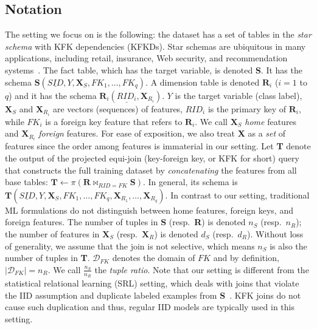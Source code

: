 \documentclass{vldb}
\begin{document}
\subsection{Notation}
The setting we focus on is the following: the dataset has a set of tables in the \textit{star schema} with KFK dependencies (KFKDs).
Star schemas are ubiquitous in many applications, including retail, insurance, Web security, and recommendation systems~\cite{cowbook,hamlet,orion}.
The fact table, which has the target variable, is denoted \textbf{S}. It has the schema $\textbf{S}(\underline{SID},Y, \textbf{X}_S, FK_1, \dots, FK_q)$.
A dimension table is denoted $\textbf{R}_i$ ($i = 1$ to $q$) and it has the schema $\textbf{R}_i(\underline{RID_i},\textbf{X}_{R_i})$.
$Y$ is the target variable (class label), $\textbf{X}_S$ and $\textbf{X}_{R_i}$ are vectors (sequences) of features, $RID_i$ is the primary key
of $\textbf{R}_i$, while $FK_i$ is a foreign key feature that refers to $\textbf{R}_i$. 
We call $\textbf{X}_S$ \textit{home} features and $\textbf{X}_{R_i}$ \textit{foreign} features.
For ease of exposition, we also treat \textbf{X} as a \textit{set} of features since the order among features is immaterial in our setting.
Let \textbf{T} denote the output of the projected equi-join (key-foreign key, or KFK for short) query that constructs the full training dataset by 
\textit{concatenating} the features from all base tables: $\textbf{T} \leftarrow \pi(\textbf{R} \bowtie_{RID=FK} \textbf{S})$. In general, its schema is 
$\textbf{T}(\underline{SID},Y,\textbf{X}_S,FK_1,\dots,FK_q,\textbf{X}_{R_1},\dots,\textbf{X}_{R_q})$. In contrast to our setting, traditional ML 
formulations do not distinguish between home features, foreign keys, and foreign features. The number of tuples in \textbf{S} (resp.~\textbf{R}) is 
denoted $n_S$ (resp.~$n_R$); the number of features in $\textbf{X}_S$ (resp.~$\textbf{X}_R$) is denoted $d_S$ (resp.~$d_R$). Without loss of generality, we
assume that the join is not selective, which means $n_S$ is also the number of tuples in \textbf{T}. $\mathcal{D}_{FK}$ denotes the domain of $FK$ 
and by definition, $|\mathcal{D}_{FK}| = n_R$. We call $\frac{n_S}{n_R}$ the \textit{tuple ratio}.
Note that our setting is different from the statistical relational learning (SRL) setting, which deals with joins that violate the IID 
assumption and duplicate labeled examples from \textbf{S}~\cite{srlbook}. KFK joins do not cause such duplication and thus, regular IID models
are typically used in this setting.
\end{document}
